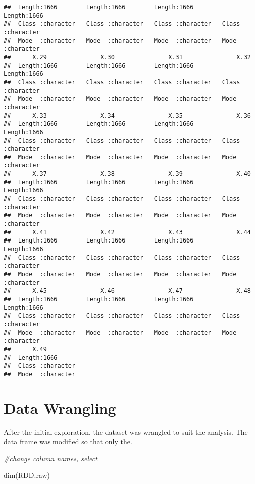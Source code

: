 \documentclass[
]{article}
\newenvironment{Shaded}{\begin{snugshade}}{\end{snugshade}}
\newcommand{\CommentTok}[1]{\textcolor[rgb]{0.56,0.35,0.01}{\textit{#1}}}
\newcommand{\FunctionTok}[1]{\textcolor[rgb]{0.00,0.00,0.00}{#1}}
\newcommand{\NormalTok}[1]{#1}
\begin{document}
\begin{verbatim}
##  Length:1666        Length:1666        Length:1666        Length:1666       
##  Class :character   Class :character   Class :character   Class :character  
##  Mode  :character   Mode  :character   Mode  :character   Mode  :character  
##      X.29               X.30               X.31               X.32          
##  Length:1666        Length:1666        Length:1666        Length:1666       
##  Class :character   Class :character   Class :character   Class :character  
##  Mode  :character   Mode  :character   Mode  :character   Mode  :character  
##      X.33               X.34               X.35               X.36          
##  Length:1666        Length:1666        Length:1666        Length:1666       
##  Class :character   Class :character   Class :character   Class :character  
##  Mode  :character   Mode  :character   Mode  :character   Mode  :character  
##      X.37               X.38               X.39               X.40          
##  Length:1666        Length:1666        Length:1666        Length:1666       
##  Class :character   Class :character   Class :character   Class :character  
##  Mode  :character   Mode  :character   Mode  :character   Mode  :character  
##      X.41               X.42               X.43               X.44          
##  Length:1666        Length:1666        Length:1666        Length:1666       
##  Class :character   Class :character   Class :character   Class :character  
##  Mode  :character   Mode  :character   Mode  :character   Mode  :character  
##      X.45               X.46               X.47               X.48          
##  Length:1666        Length:1666        Length:1666        Length:1666       
##  Class :character   Class :character   Class :character   Class :character  
##  Mode  :character   Mode  :character   Mode  :character   Mode  :character  
##      X.49          
##  Length:1666       
##  Class :character  
##  Mode  :character
\end{verbatim}

\hypertarget{data-wrangling}{%
\section{Data Wrangling}\label{data-wrangling}}

After the initial exploration, the dataset was wrangled to suit the
analysis. The data frame was modified so that only the.

\begin{Shaded}
\begin{Highlighting}[]
\CommentTok{\#change column names, select }

\FunctionTok{dim}\NormalTok{(RDD.raw)}
\end{Highlighting}
\end{Shaded}
\end{document}
